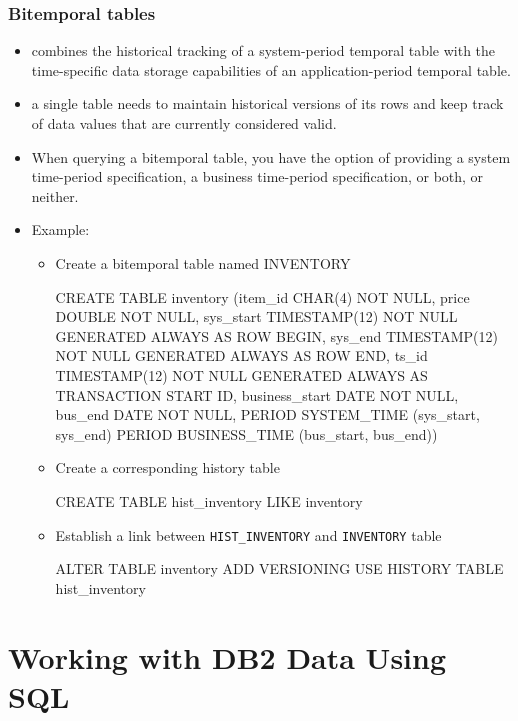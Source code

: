 \documentclass{article}
\begin{document}
\subsubsection{Bitemporal tables}
\begin{itemize}
	\item combines the historical tracking of a system-period temporal table with the time-specific data storage capabilities of an application-period temporal table.
	\item a single table needs to maintain historical versions of its rows and keep track of data values that are currently considered valid.
	\item When querying a bitemporal table, you have the option of providing a system time-period 
	specification, a business time-period specification, or both, or neither.
	\item Example: 
		\begin{itemize}
			\item Create a bitemporal table named INVENTORY
			\begin{sqlcode}
			CREATE TABLE inventory
			 (item_id         CHAR(4) NOT NULL,
			  price           DOUBLE NOT NULL,
			  sys_start       TIMESTAMP(12) NOT NULL
							    GENERATED ALWAYS AS ROW BEGIN,
			  sys_end  		  TIMESTAMP(12) NOT NULL
							    GENERATED ALWAYS AS ROW END,
			  ts_id			  TIMESTAMP(12) NOT NULL
							    GENERATED ALWAYS AS
							    TRANSACTION START ID, 
			  business_start  DATE NOT NULL,
			  bus_end         DATE NOT NULL,
			 PERIOD SYSTEM_TIME (sys_start, sys_end)
			 PERIOD BUSINESS_TIME (bus_start, bus_end))
			\end{sqlcode}
			\item Create a corresponding history table
			\begin{sqlcode}
			CREATE TABLE hist_inventory LIKE inventory
			\end{sqlcode}
			\item Establish a link between \texttt{HIST\_INVENTORY} and \texttt{INVENTORY} table
			\begin{sqlcode}
				ALTER TABLE inventory
				 ADD VERSIONING
				 USE HISTORY TABLE hist_inventory
			\end{sqlcode}
		\end{itemize}
\end{itemize}

\newpage
\section{Working with DB2 Data Using SQL}
\end{document}
